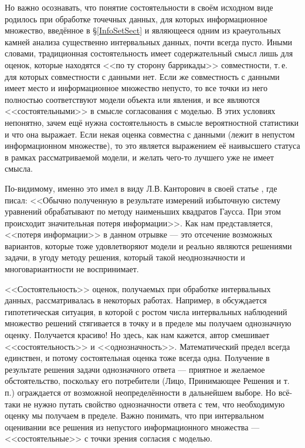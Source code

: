 \documentclass[a5paper,openany]{book}
\begin{document}
  
Но важно осознавать, что понятие состоятельности в своём исходном виде родилось 
при обработке точечных данных, для которых информационное множество, введённое 
в \S\ref{InfoSetSect} и являющееся одним из краеугольных камней анализа существенно 
интервальных данных, почти всегда пусто. Иными словами, традиционная состоятельность 
имеет содержательный смысл лишь для оценок, которые находятся <<по ту сторону 
баррикады>> совместности, т.\,е. для которых совместности с данными нет. Если же 
совместность с данными имеет место и информационное множество непусто, то все точки 
из него полностью соответствуют модели объекта или явления, и все являются 
<<состоятельными>> в смысле согласования с моделью. В этих условиях непонятно, 
зачем ещё нужна состоятельность в смысле вероятностной статистики и что она выражает. 
Если некая оценка совместна с данными (лежит в непустом информационном множестве), 
то это является выражением её наивысшего статуса в рамках рассматриваемой модели, 
и желать чего-то лучшего уже не имеет смысла. 
  
По-видимому, именно это имел в виду Л.В.\,Канторович в своей статье \cite{Kantorovich}, 
где писал: <<Обычно полученную в результате измерений избыточную систему уравнений 
обрабатывают по методу наименьших квадратов Гаусса. При этом происходит значительная 
потеря информации>>. Как нам представляется, <<потеря информации>> в данном отрывке 
--- это отсечение возможных вариантов, которые тоже удовлетворяют модели и реально 
являются решениями задачи, в угоду методу решения, который такой неоднозначности 
и многовариантности не воспринимает. 
  
<<Состоятельность>> оценок, получаемых при обработке интервальных данных, 
рассматривалась в некоторых работах. Например, в \cite{Kurzhanski} обсуждается 
гипотетическая ситуация, в которой с ростом числа интервальных наблюдений множество 
решений стягивается в точку и в пределе мы получаем однозначную оценку. Получается 
красиво! Но здесь, как нам кажется, автор смешивает <<состоятельность>> и 
<<однозначность>>. Математический предел всегда единствен, и потому состоятельная 
оценка тоже всегда одна. Получение в результате решения задачи однозначного ответа 
--- приятное и желаемое обстоятельство, поскольку его потребители (Лицо, Принимающее 
Решения и т.\,п.) ограждается от возможной неопределённости в дальнейшем выборе. 
Но всё-таки не нужно путать свойство однозначности ответа с тем, что необходимую 
оценку мы получаем в пределе. Важно понимать, что при интервальном оценивании все 
решения из непустого информационного множества --- <<состоятельные>> с точки зрения 
согласия с моделью. 
  
\end{document}
